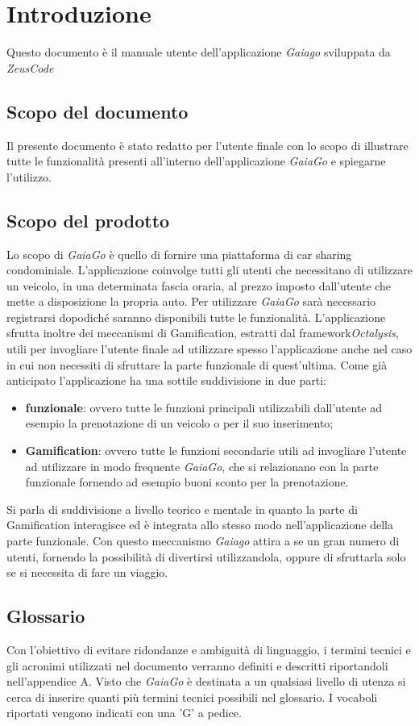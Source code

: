 \section{Introduzione}
Questo documento è il manuale utente dell'applicazione \textit{Gaiago} sviluppata da \textit{ZeusCode}
\subsection{Scopo del documento}
Il presente documento è stato redatto per l’utente finale con lo scopo di illustrare tutte le funzionalità presenti all'interno dell'applicazione \textit{GaiaGo} e spiegarne l’utilizzo.

\subsection{Scopo del prodotto}
Lo scopo di \textit{GaiaGo} è quello di fornire una piattaforma di car sharing condominiale. L'applicazione coinvolge tutti gli utenti che necessitano di utilizzare un veicolo, in una determinata fascia oraria, al prezzo imposto dall'utente che mette a disposizione la propria auto. Per utilizzare \textit{GaiaGo} sarà necessario registrarsi dopodiché saranno disponibili tutte le funzionalità. L'applicazione sfrutta inoltre dei meccanismi di Gamification\glosp, estratti dal framework\glosp \textit{Octalysis}\glosp, utili per invogliare l'utente finale ad utilizzare spesso l'applicazione anche nel caso in cui non necessiti di sfruttare la parte funzionale di quest'ultima. Come già anticipato l'applicazione ha una sottile suddivisione in due parti:
\begin{itemize}
	\item \textbf{funzionale}: ovvero tutte le funzioni principali utilizzabili dall'utente ad esempio la prenotazione di un veicolo o per il suo inserimento; 
	\item \textbf{Gamification}: ovvero tutte le funzioni secondarie utili ad invogliare l'utente ad utilizzare in modo frequente \textit{GaiaGo}, che si relazionano con la parte funzionale fornendo ad esempio buoni sconto per la prenotazione.
\end{itemize}
 Si parla di suddivisione a livello teorico e mentale in quanto la parte di Gamification interagisce ed è integrata allo stesso modo nell'applicazione della parte funzionale.
 Con questo meccanismo \textit{Gaiago} attira a se un gran numero di utenti, fornendo la possibilità di divertirsi utilizzandola, oppure di sfruttarla solo se si necessita di fare un viaggio.
\subsection{Glossario}
Con l'obiettivo di evitare ridondanze e ambiguità di linguaggio, i termini tecnici e gli acronimi
utilizzati nel documento verranno definiti e descritti riportandoli nell'appendice A.
Visto che \textit{GaiaGo} è destinata a un qualsiasi livello di utenza si cerca di inserire quanti più termini tecnici possibili nel glossario.
I vocaboli riportati vengono indicati con una 'G' a pedice.